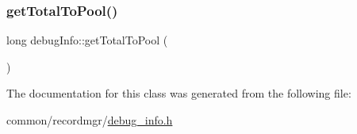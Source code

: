 \mbox{\label{classdebugInfo_abb0bb251d71ff691950ebacd0d29f7c3}} 
\subsubsection{\texorpdfstring{get\+Total\+To\+Pool()}{getTotalToPool()}}
{\footnotesize\ttfamily long debug\+Info\+::get\+Total\+To\+Pool (\begin{DoxyParamCaption}{ }\end{DoxyParamCaption})\hspace{0.3cm}{\ttfamily [inline]}}



The documentation for this class was generated from the following file\+:\begin{DoxyCompactItemize}
\item 
common/recordmgr/\hyperlink{debug__info_8h}{debug\+\_\+info.\+h}\end{DoxyCompactItemize}
